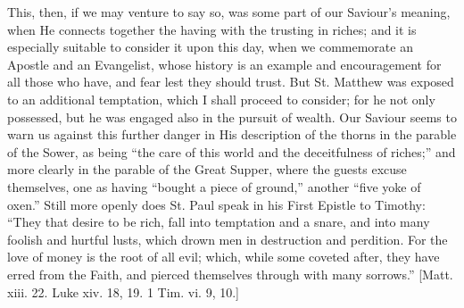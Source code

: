 This, then, if we may venture to say so, was some part of our
Saviour's meaning, when He connects together the having with the
trusting in riches; and it is especially suitable to consider it upon
this day, when we commemorate an Apostle and an Evangelist, whose
history is an example and encouragement for all those who have, and fear
lest they should trust. But St. Matthew was exposed to an additional
temptation, which I shall proceed to consider; for he not only
possessed, but he was engaged also in the pursuit of wealth. Our Saviour
seems to warn us against this further danger in His description of the
thorns in the parable of the Sower, as being ``the care of this
world and the deceitfulness of riches;'' and more clearly in the
parable of the Great Supper, where the guests excuse themselves, one as
having ``bought a piece of ground,'' another ``five yoke of
oxen.'' Still more openly does St. Paul speak in his First Epistle
to Timothy: ``They that desire to be rich, fall into temptation and
a snare, and into many foolish and hurtful lusts, which drown men in
destruction and perdition. For the love of money is the root of all
evil; which, while some coveted after, they have erred from the Faith,
and pierced themselves through with many sorrows.'' [Matt. xiii. 22.
Luke xiv. 18, 19. 1 Tim. vi. 9, 10.]

